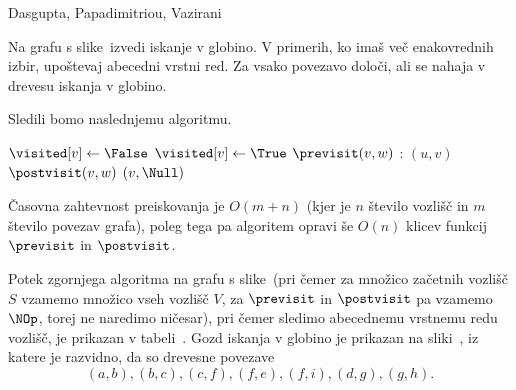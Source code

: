 \begin{naloga}%
{Dasgupta, Papadimitriou, Vazirani}{\cite[Exercise~3.1]{dpv}}
\begin{vprasanje}
Na grafu s slike~\fig[bfs] izvedi iskanje v globino.
V primerih, ko imaš več ena\-ko\-vred\-nih izbir,
upoštevaj abecedni vrstni red.
Za vsako povezavo določi, ali se nahaja v drevesu iskanja v globino.
\end{vprasanje}

\begin{odgovor}
Sledili bomo naslednjemu algoritmu.
\begin{small}
\begin{algorithmic}
		\State $\visited[v] \gets \False$
	\EndFor
        \If{$\visited[v]$}
            \State \Return
        \EndIf
        \State $\visited[v] \gets \True$
        \State $\previsit(v, w)$
		:
            $(u, v)$
		\EndFor
        \State $\postvisit(v, w)$
    \EndFunction
		$(v, \Null)$
	\EndFor
\EndFunction
\end{algorithmic}
\end{small}
Časovna zahtevnost preiskovanja je $O(m + n)$
(kjer je $n$ število vozlišč in $m$ število povezav grafa),
poleg tega pa algoritem opravi
še $O(n)$ klicev funkcij $\previsit$ in $\postvisit$.

Potek zgornjega algoritma na grafu s slike~\fig[bfs]
(pri čemer za množico za\-čet\-nih vozlišč $S$
vzamemo množico vseh vozlišč $V$,
za $\previsit$ in $\postvisit$ pa vzamemo $\NOp$,
torej ne naredimo ničesar),
pri čemer sledimo abecednemu vrstnemu redu vozlišč,
je prikazan v tabeli~\tab.
Gozd iskanja v globino je prikazan na sliki~\fig,
iz katere je razvidno, da so drevesne povezave
$$
(a, b), (b, c), (c, f), (f, e), (f, i), (d, g), (g, h).
$$


\end{odgovor}
\end{naloga}

